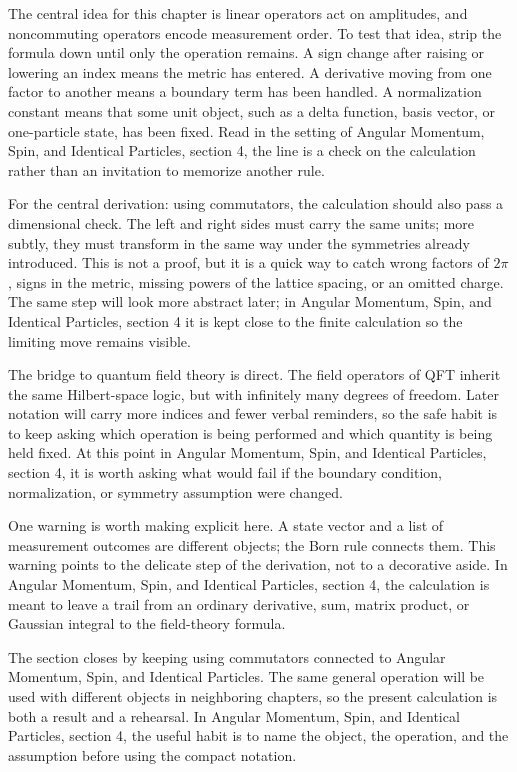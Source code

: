 The central idea for this chapter is linear operators act on amplitudes, and noncommuting operators encode measurement order.  To test that idea, strip the formula down until only the operation remains.  A sign change after raising or lowering an index means the metric has entered.  A derivative moving from one factor to another means a boundary term has been handled.  A normalization constant means that some unit object, such as a delta function, basis vector, or one-particle state, has been fixed.  Read in the setting of Angular Momentum, Spin, and Identical Particles, section 4, the line is a check on the calculation rather than an invitation to memorize another rule.

For the central derivation: using commutators, the calculation should also pass a dimensional check.  The left and right sides must carry the same units; more subtly, they must transform in the same way under the symmetries already introduced.  This is not a proof, but it is a quick way to catch wrong factors of \(2\pi\), signs in the metric, missing powers of the lattice spacing, or an omitted charge.  The same step will look more abstract later; in Angular Momentum, Spin, and Identical Particles, section 4 it is kept close to the finite calculation so the limiting move remains visible.

The bridge to quantum field theory is direct.  The field operators of QFT inherit the same Hilbert-space logic, but with infinitely many degrees of freedom.  Later notation will carry more indices and fewer verbal reminders, so the safe habit is to keep asking which operation is being performed and which quantity is being held fixed.  At this point in Angular Momentum, Spin, and Identical Particles, section 4, it is worth asking what would fail if the boundary condition, normalization, or symmetry assumption were changed.

One warning is worth making explicit here.  A state vector and a list of measurement outcomes are different objects; the Born rule connects them.  This warning points to the delicate step of the derivation, not to a decorative aside.  In Angular Momentum, Spin, and Identical Particles, section 4, the calculation is meant to leave a trail from an ordinary derivative, sum, matrix product, or Gaussian integral to the field-theory formula.

The section closes by keeping using commutators connected to Angular Momentum, Spin, and Identical Particles.  The same general operation will be used with different objects in neighboring chapters, so the present calculation is both a result and a rehearsal.  In Angular Momentum, Spin, and Identical Particles, section 4, the useful habit is to name the object, the operation, and the assumption before using the compact notation.



